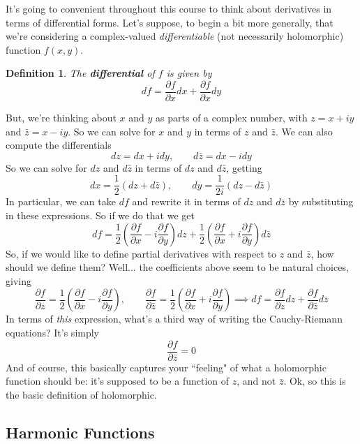 \documentclass{article}
\newcommand{\prt}[2]{{\frac{\partial {#1}}{\partial {#2}}}}
\newtheorem{definition}{Definition}
\begin{document}
It's going to convenient throughout this course to think about derivatives in terms of differential forms. Let's suppose, to begin a bit more generally, that we're considering a complex-valued \textit{differentiable} (not necessarily holomorphic) function \(f(x, y)\).
\begin{definition}
The \textbf{differential} of \(f\) is given by
\begin{equation}df = \prt{f}{x}dx + \prt{f}{x}dy\end{equation}
\end{definition}
But, we're thinking about \(x\) and \(y\) as parts of a complex number, with \(z = x + iy\) and \(\bar{z} = x - iy\). So we can solve for \(x\) and \(y\) in terms of \(z\) and \(\bar{z}\). We can also compute the differentials
\begin{equation}dz = dx + idy, \qquad d\bar{z} = dx - idy\end{equation}
So we can solve for \(dz\) and \(d\bar{z}\) in terms of \(dz\) and \(d\bar{z}\), getting
\begin{equation}dx = \frac{1}{2}(dz + d\bar{z}), \qquad dy = \frac{1}{2i}(dz - d\bar{z})\end{equation}
In particular, we can take \(df\) and rewrite it in terms of \(dz\) and \(d\bar{z}\) by substituting in these expressions. So if we do that we get
\begin{equation}df = \frac{1}{2}\left(\prt{f}{x} - i\prt{f}{y}\right)dz + \frac{1}{2}\left(\prt{f}{x} + i\prt{f}{y}\right)d\bar{z}\end{equation}
So, if we would like to define partial derivatives with respect to \(z\) and \(\bar{z}\), how should we define them? Well... the coefficients above seem to be natural choices, giving
\begin{equation}\prt{f}{z} = \frac{1}{2}\left(\prt{f}{x} - i\prt{f}{y}\right),
  \qquad \prt{f}{\bar{z}}
= \frac{1}{2}\left(\prt{f}{x} + i\prt{f}{y}\right)
\implies df = \prt{f}{z}dz + \prt{f}{\bar{z}}d\bar{z}\end{equation}
In terms of \textit{this} expression, what's a third way of writing the Cauchy-Riemann equations? It's simply
\begin{equation}\prt{f}{\bar{z}} = 0\end{equation}
And of course, this basically captures your ``feeling" of what a holomorphic function should be: it's supposed to be a function of \(z\), and not \(\bar{z}\). Ok, so this is the basic definition of holomorphic.

\subsection{Harmonic Functions}
\end{document}
